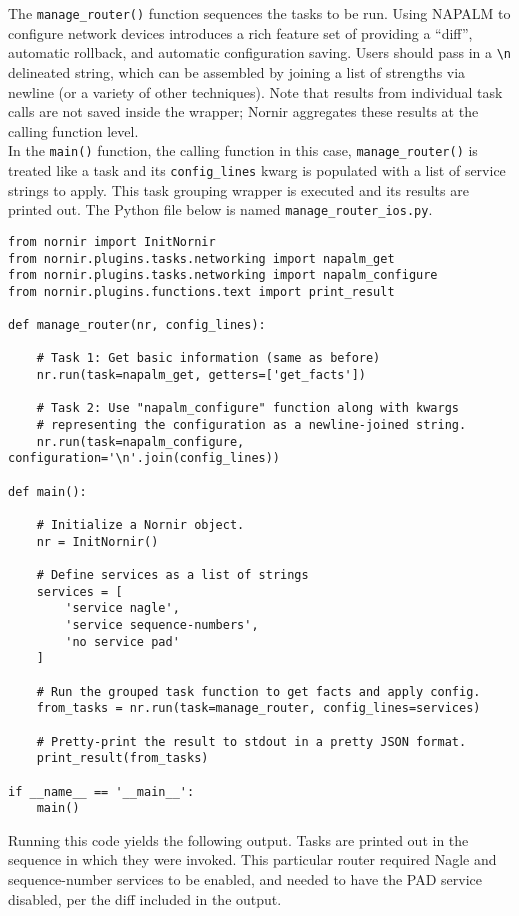 The \verb|manage_router()| function sequences the tasks to be run. Using
NAPALM to configure network devices introduces a rich feature set of providing
a ``diff'', automatic rollback, and automatic configuration saving. Users
should pass in a \verb|\n| delineated string, which can be assembled by joining a
list of strengths via newline (or a variety of other techniques). Note that
results from individual task calls are not saved inside the wrapper; Nornir
aggregates these results at the calling function level. \\

In the \verb|main()| function, the calling function in this case,
\verb|manage_router()| is treated like a task and its \verb|config_lines|
kwarg is populated with a list of service strings to apply. This task grouping
wrapper is executed and its results are printed out. The Python file below
is named \verb|manage_router_ios.py|.

\begin{verbatim}
from nornir import InitNornir
from nornir.plugins.tasks.networking import napalm_get
from nornir.plugins.tasks.networking import napalm_configure
from nornir.plugins.functions.text import print_result

def manage_router(nr, config_lines):

    # Task 1: Get basic information (same as before)
    nr.run(task=napalm_get, getters=['get_facts'])

    # Task 2: Use "napalm_configure" function along with kwargs
    # representing the configuration as a newline-joined string.
    nr.run(task=napalm_configure, configuration='\n'.join(config_lines))

def main():

    # Initialize a Nornir object.
    nr = InitNornir()

    # Define services as a list of strings
    services = [
        'service nagle',
        'service sequence-numbers',
        'no service pad'
    ]

    # Run the grouped task function to get facts and apply config.
    from_tasks = nr.run(task=manage_router, config_lines=services)

    # Pretty-print the result to stdout in a pretty JSON format.
    print_result(from_tasks)

if __name__ == '__main__':
    main()
\end{verbatim}

Running this code yields the following output. Tasks are printed out in the
sequence in which they were invoked. This particular router required Nagle and
sequence-number services to be enabled, and needed to have the PAD service
disabled, per the diff included in the output.

